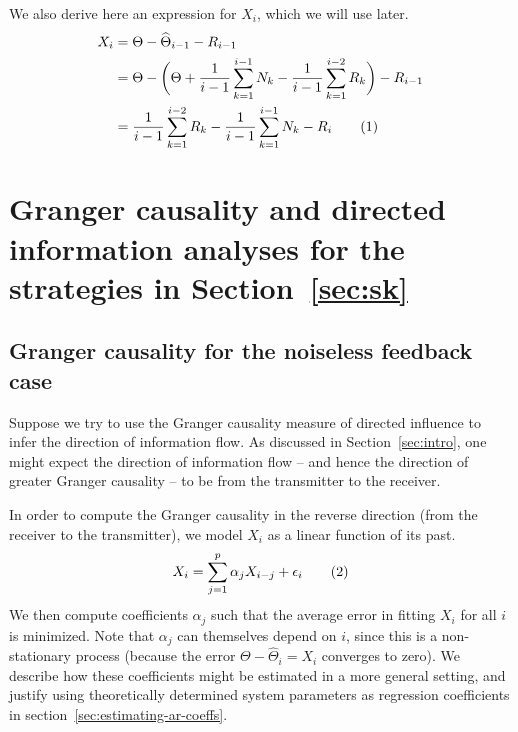 \documentclass[letterpaper, 10pt, conference]{ieeeconf}
\newcommand\numberthis{\stepcounter{equation}\tag{\theequation}}
\begin{document}
We also derive here an expression for $X_i$, which we will use later.
\begin{align*}
	X_i &= \Theta - \widehat\Theta_{i-1} - R_{i-1} \\
	&= \Theta - \bigg( \Theta + \frac{1}{i-1} \sum_{k=1}^{i-1} N_k - \frac{1}{i-1} \sum_{k=1}^{i-2} R_k \bigg) - R_{i-1} \\
	&= \frac{1}{i-1} \sum_{k=1}^{i-2} R_k - \frac{1}{i-1} \sum_{k=1}^{i-1} N_k - R_{i} \numberthis \label{eq:x_i-noisy}
\end{align*}


\section{Granger causality and directed information analyses for the strategies in Section~\ref{sec:sk}}
\label{sec:analytical-results}


\subsection{Granger causality for the noiseless feedback case}
\label{sec:gc-noiseless}

Suppose we try to use the Granger causality measure of directed influence to infer the direction of information flow. As discussed in Section~\ref{sec:intro}, one might expect the direction of information flow -- and hence the direction of greater Granger causality -- to be from the transmitter to the receiver.

In order to compute the Granger causality in the reverse direction (from the receiver to the transmitter), we model $X_i$ as a linear function of its past.
\begin{equation*}
	X_i = \sum_{j=1}^{p}{\alpha_j X_{i-j}} + \epsilon_i \numberthis \label{eq:ar-model-x-x}
\end{equation*}
We then compute coefficients $\alpha_j$ such that the average error in fitting $X_i$ for all $i$ is minimized. Note that $\alpha_j$ can themselves depend on $i$, since this is a non-stationary process (because the error $\Theta-\widehat{\Theta}_i = X_i$ converges to zero). We describe how these coefficients might be estimated in a more general setting, and justify using theoretically determined system parameters as regression coefficients in section~\ref{sec:estimating-ar-coeffs}.
\end{document}
